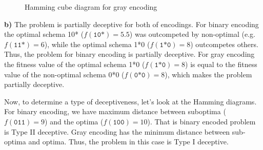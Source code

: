 \documentclass[12pt, a4paper]{article}
\begin{document}
        \begin{figure}[H]
            \centering
            \caption{Hamming cube diagram for gray encoding}
            \label{fig:hamm_gray}
        \end{figure}

        {\bf b)} The problem is partially deceptive for both of encodings. For binary
        encoding the optimal schema 10* ($f(\texttt{10*}) = 5.5$) was outcompeted by non-optimal
        (e.g. $f(\texttt{11*}) = 6$), while the optimal schema 1*0 ($f(\texttt{1*0}) = 8$) outcompetes
        others. Thus, the problem for binary encoding is partially deceptive. For gray
        encoding the fitness value of the optimal schema 1*0 ($f(\texttt{1*0}) = 8$) is equal
        to the fitness value of the non-optimal schema 0*0 ($f(\texttt{0*0}) = 8$), which makes
        the problem partially deceptive.

        Now, to determine a type of deceptiveness, let's
        look at the Hamming diagrams. For binary encoding, we have maximum distance between
        suboptima ($f(\texttt{011}) = 9$) and the optima ($f(\texttt{100}) = 10$). That is binary encoded
        problem is Type II deceptive. Gray encoding has the minimum distance between sub-optima
        and optima. Thus, the problem in this case is Type I deceptive.
\end{document}
